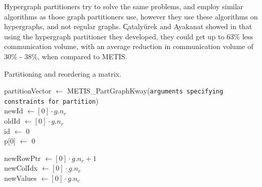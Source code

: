 \begin{flushright}
    \cite{hypergraphpartitioning}
\end{flushright}
\medskip
Hypergraph partitioners try to solve the same problems, and employ similar algorithms as those graph partitioners use, however they use these algorithms on hypergraphs, and not regular graphs. \k Cataly\" urek and Ayakanat showed in \cite{hypergraphpartitioning} that using the hypergraph partitioner they developed, they could get up to 63\% less communication volume, with an average reduction in communication volume of 30\% - 38\%, when compared to METIS.


\begin{algorithm}[H]
    \caption{Partitioning and reordering a matrix.}
    \label{alg:partitioning}
    \SetAlgoVlined


    partitionVector \(\gets\) METIS\_PartGraphKway(\texttt{arguments specifying constraints for partition})\\

    newId \(\gets [0] \cdot g.n_{r}\)\\
    oldId \(\gets [0] \cdot g.n_{r}\)\\
    id \(\gets\) 0 \\
    p[0] \(\gets\) 0 \\


    newRowPtr \(\gets [0] \cdot g.n_{r} + 1\)\\
    newColIdx \(\gets [0] \cdot g.n_{c}\)\\
    newValues \(\gets [0] \cdot g.n_{c}\)\\



\end{algorithm}
